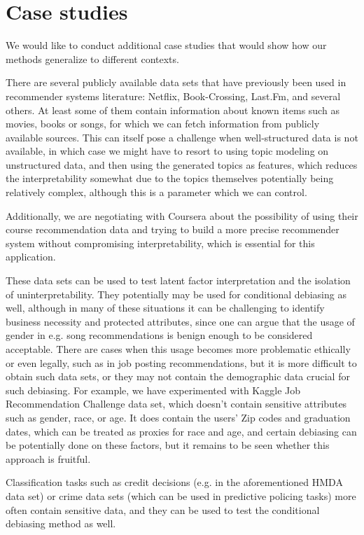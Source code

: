 \section{Case studies}

We would like to conduct additional case studies that would show how our methods
generalize to different contexts.

There are several publicly available data sets that have previously been used in
recommender systems literature: Netflix, Book-Crossing, Last.Fm, and several
others\cite{bobadilla2013recommender}. At least some of them contain information
about known items such as movies, books or songs, for which we can
fetch information from publicly available sources. This can itself pose a
challenge when well-structured data is not available, in which case we might
have to resort to using topic modeling on unstructured data, and then using the
generated topics as features, which reduces the interpretability somewhat due to
the topics themselves potentially being relatively complex, although this is a
parameter which we can control.

Additionally, we are negotiating with Coursera about the possibility of using
their course recommendation data and trying to build a more precise recommender
system without compromising interpretability, which is essential for this
application.

These data sets can be used to test latent factor interpretation and the
isolation of uninterpretability. They potentially may be used for conditional
debiasing as well, although in many of these situations it can be challenging to
identify business necessity and protected attributes, since one can argue that
the usage of gender in e.g. song recommendations is benign enough to be considered
acceptable. There are cases when this usage becomes more problematic ethically
or even legally, such as in job posting recommendations, but it is more difficult
to obtain such data sets, or they may not contain the demographic data crucial for
such debiasing. For example, we have experimented with Kaggle Job Recommendation
Challenge data set\cite{data-jobs}, which doesn't contain sensitive attributes
such as gender, race, or age. It does contain the users' Zip codes and graduation
dates, which can be treated as proxies for race and age, and certain debiasing
can be potentially done on these factors, but it remains to be seen whether this
approach is fruitful.

Classification tasks such as credit decisions (e.g. in the aforementioned HMDA
data set\cite{data-hmda}) or crime data sets (which can be used in predictive
policing tasks) more often contain sensitive data, and they can be used
to test the conditional debiasing method as well.
